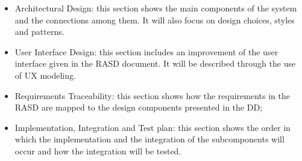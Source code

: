 \begin{legal}
		\begin{itemize}
				\item Architectural Design: this section shows the main components of the system and the connections among them. It will also focus on design choices, styles and patterns.
				\item User Interface Design: this section includes an improvement of the user interface given in the RASD document. It will be described through the use of UX modeling.
				\item Requirements Traceability: this section shows how the requirements in the RASD are mapped to the design components presented in the DD;
				\item Implementation, Integration and Test plan: this section shows the order in which the implementation and the integration of the subcomponents will occur and how the integration will be tested.\\
			\end{itemize}
  	\end{legal}

